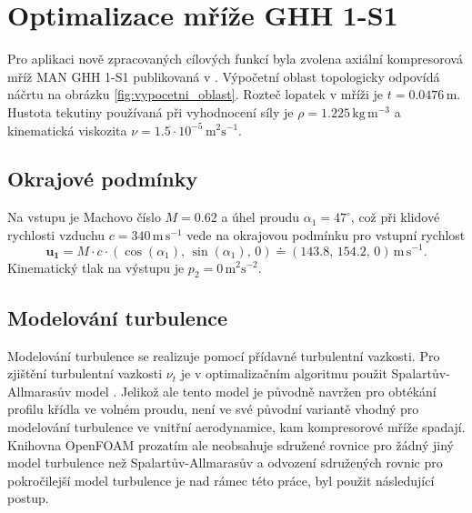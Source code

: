 \section{Optimalizace mříže GHH 1-S1}
Pro aplikaci nově zpracovaných cílových funkcí byla zvolena axiální kompresorová mříž MAN GHH 1-S1 publikovaná v \cite{steinert1990design}.
Výpočetní oblast topologicky odpovídá náčrtu na obrázku \ref{fig:vypocetni_oblast}.
Rozteč lopatek v mříži je $ t=0.0476\,\mathrm{m} $. Hustota tekutiny používaná při vyhodnocení síly je $ \rho=1.225\,\mathrm{kg\,m^{-3}} $ a kinematická viskozita $ \nu = 1.5\cdot10^{-5} \, \mathrm{m^2s^{-1}} $.

\subsection{Okrajové podmínky}  Na vstupu je Machovo číslo $ M=0.62 $ a úhel proudu $ \alpha_1 = 47^\circ $, což při klidové rychlosti vzduchu $ c=340 \,\mathrm{m\,s^{-1}} $ vede na okrajovou podmínku pro vstupní rychlost  
\begin{equation}\label{key}
\mathbf{u_1}=M\cdot c \cdot (\cos(\alpha_1),\, \sin(\alpha_1),\, 0) \doteq (143.8,\, 154.2,\, 0)\, \mathrm{m\,s^{-1}}.
\end{equation}
Kinematický tlak na výstupu je $ p_2=0\,\mathrm{m^2s^{-2}} $.

\subsection{Modelování turbulence}
Modelování turbulence se realizuje pomocí přídavné turbulentní vazkosti. Pro zjištění turbulentní vazkosti $ \nu_t $ je v optimalizačním algoritmu použit Spalartův-Allmarasův model \cite{spalart1992one}. Jelikož ale tento model je původně navržen pro obtékání profilu křídla ve volném proudu, není ve své původní variantě vhodný pro modelování turbulence ve vnitřní aerodynamice, kam kompresorové mříže spadají. Knihovna OpenFOAM prozatím ale neobsahuje sdružené rovnice pro žádný jiný model turbulence než Spalartův-Allmarasův a odvození sdružených rovnic pro pokročilejší model turbulence je nad rámec této práce, byl použit následující postup. 

